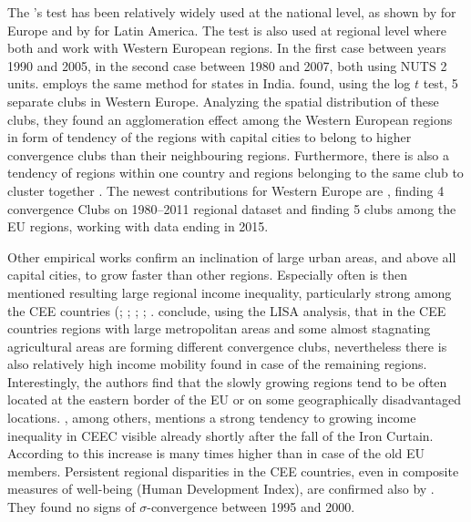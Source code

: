 \documentclass[11pt]{article}
\begin{document}
The \cite{phillips2007transition}'s test
has been relatively widely used at the national level, as shown by \citet{borsi2015evolution, fritsche2011analysing, monfort2013real,apergis2010old} for Europe and by \citet{rodriguez2014there} for Latin America. The test is also used at regional level where both \citet{bartkowska2012regional} and \citet{pinho2010regional} work with Western European regions. In the first case between years 1990 and 2005, in the second case between 1980 and 2007, both using NUTS 2 units. \citet{ghosh2013regional} employs the same method for states in India. \citet{bartkowska2012regional} found, using the log $t$ test, 5 separate clubs in Western Europe. Analyzing the spatial distribution of these clubs, they found an agglomeration effect among the Western European regions in form of tendency of the regions with capital cities to belong to higher convergence clubs than their neighbouring regions. Furthermore, there is also a tendency of regions within one country and regions belonging to the same club to cluster together \citep{bartkowska2012regional}. The newest contributions for Western Europe are \citet{von2017regional}, finding 4 convergence Clubs on 1980–2011 regional dataset and \citet{cutrini2019economic} finding 5 clubs among the EU regions, working with data ending in 2015. 

Other empirical works confirm an inclination of large urban areas, and above all capital cities, to grow faster than other regions. Especially often is then mentioned resulting large regional income inequality, particularly strong among the CEE countries (\citet{cuaresma2014determinants}; \citet{sme2012regional}; \citet{szendi2013convergence}; \citet{chapman2012income}; \citet{monastiriotis2011regional}. \citet{sme2012regional} conclude, using the LISA analysis, that in the CEE countries regions with large metropolitan areas and some almost stagnating agricultural areas are forming different convergence clubs, nevertheless there is also relatively high income mobility found in case of the remaining regions. Interestingly, the authors find that the slowly growing regions tend to be often located at the eastern border of the EU or on some geographically disadvantaged locations. \citet{monastiriotis2011regional}, among others, mentions a strong tendency to growing income inequality in CEEC visible already shortly after the fall of the Iron Curtain. According to \citeauthor{monastiriotis2011regional} this increase is many times higher than in case of the old EU members. Persistent regional disparities in the CEE countries, even in composite measures of well-being (Human Development Index), are confirmed also by \citet{benedek2015paths}. They found no signs of $\sigma$-convergence between 1995 and 2000. 
\end{document}
